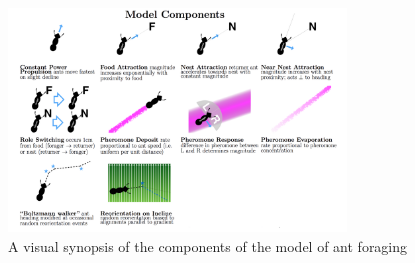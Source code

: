 \begin{figure}[h] 
     \centering
      \includegraphics[width=0.8\textwidth]{img/model_components}
      \caption{A visual synopsis of the components of the model of ant foraging}
      \label{fig:model_components}
\end{figure}